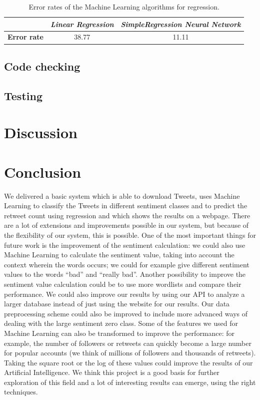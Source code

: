 \documentclass[10pt]{IEEEtran}
\begin{document}
\begin{table}[h]
	\centering
		\begin{tabular}{ | >{\bfseries}l || c | c |}
		\hline
		&  \emph{Linear Regression} & \emph{SimpleRegression Neural Network} \\ 
		\hline
		\hline
		Error rate & 38.77 & 11.11 \\ 
		\hline  
		\end{tabular}
    \caption{Error rates of the Machine Learning algorithms for regression.}
    \label{tableregression}
\end{table} 


\subsection{Code checking}


\subsection{Testing}


\section{Discussion}


\section{Conclusion}

We delivered a basic system which is able to download Tweets, uses Machine Learning to classify the Tweets in different sentiment classes and to predict the retweet count using regression and which shows the results on a webpage. There are a lot of extensions and improvements possible in our system, but because of the flexibility of our system, this is possible. One of the most important things for future work is the improvement of the sentiment calculation: we could also use Machine Learning to calculate the sentiment value, taking into account the context wherein the words occurs; we could for example give different sentiment values to the words ``bad'' and ``really bad''. Another possibility to improve the sentiment value calculation could be to use more wordlists and compare their performance. We could also improve our results by using our API to analyze a larger database instead of just using the website for our results. Our data preprocessing scheme could also be improved to include more advanced ways of dealing with the large sentiment zero class. Some of the features we used for Machine Learning can also be transformed to improve the performance: for example, the number of followers or retweets can quickly become a large number for popular accounts (we think of millions of followers and thousands of retweets). Taking the square root or the log of these values could improve the results of our Artificial Intelligence. We think this project is a good basis for further exploration of this field and a lot of interesting results can emerge, using the right techniques. 
\end{document}

